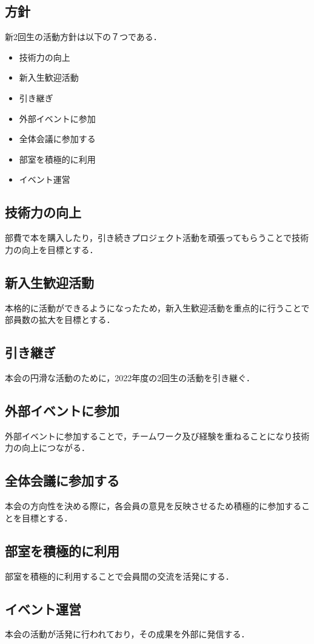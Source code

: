 \subsection*{\newGradeIfKouki{}\secondGrade{}方針}


新2回生の活動方針は以下の７つである．

\begin{itemize}
    \item 技術力の向上
    \item 新入生歓迎活動   
    \item 引き継ぎ
    \item 外部イベントに参加
    \item 全体会議に参加する
    \item 部室を積極的に利用
    \item イベント運営
\end{itemize}

\subsection*{技術力の向上}
部費で本を購入したり，引き続きプロジェクト活動を頑張ってもらうことで技術力の向上を目標とする．

\subsection*{新入生歓迎活動}
本格的に活動ができるようになったため，新入生歓迎活動を重点的に行うことで部員数の拡大を目標とする．

\subsection*{引き継ぎ}
本会の円滑な活動のために，2022年度の2回生の活動を引き継ぐ．

\subsection*{外部イベントに参加}
外部イベントに参加することで，チームワーク及び経験を重ねることになり技術力の向上につながる．

\subsection*{全体会議に参加する}
本会の方向性を決める際に，各会員の意見を反映させるため積極的に参加することを目標とする．

\subsection*{部室を積極的に利用}
部室を積極的に利用することで会員間の交流を活発にする．

\subsection*{イベント運営}
本会の活動が活発に行われており，その成果を外部に発信する．
